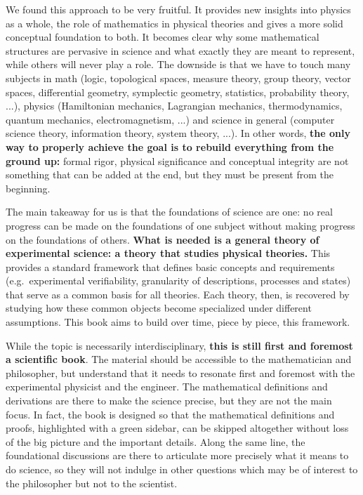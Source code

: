 \documentclass[11pt,letterpaper,fleqn]{memoir} %
\begin{document}
We found this approach to be very fruitful. It provides new insights into physics as a whole, the role of mathematics in physical theories and gives a more solid conceptual foundation to both. It becomes clear why some mathematical structures are pervasive in science and what exactly they are meant to represent, while others will never play a role. The downside is that we have to touch many subjects in math (logic, topological spaces, measure theory, group theory, vector spaces, differential geometry, symplectic geometry, statistics, probability theory, ...), physics (Hamiltonian mechanics, Lagrangian mechanics, thermodynamics, quantum mechanics, electromagnetism, ...) and science in general (computer science theory, information theory, system theory, ...). In other words, \textbf{the only way to properly achieve the goal is to rebuild everything from the ground up:} formal rigor, physical significance and conceptual integrity are not something that can be added at the end, but they must be present from the beginning.

The main takeaway for us is that the foundations of science are one: no real progress can be made on the foundations of one subject without making progress on the foundations of others. \textbf{What is needed is a general theory of experimental science: a theory that studies physical theories.} This provides a standard framework that defines basic concepts and requirements (e.g.~experimental verifiability, granularity of descriptions, processes and states) that serve as a common basis for all theories. Each theory, then, is recovered by studying how these common objects become specialized under different assumptions. This book aims to build over time, piece by piece, this framework.

While the topic is necessarily interdisciplinary, \textbf{this is still first and foremost a scientific book}. The material should be accessible to the mathematician and philosopher, but understand that it needs to resonate first and foremost with the experimental physicist and the engineer. The mathematical definitions and derivations are there to make the science precise, but they are not the main focus. In fact, the book is designed so that the mathematical definitions and proofs, highlighted with a green sidebar, can be skipped altogether without loss of the big picture and the important details. Along the same line, the foundational discussions are there to articulate more precisely what it means to do science, so they will not indulge in other questions which may be of interest to the philosopher but not to the scientist.
\end{document}
